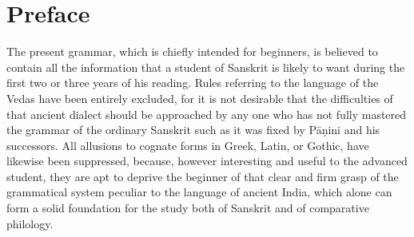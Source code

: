 \def\DevnagVersion{2.17}%
\chapter{Preface}

The present grammar, which is chiefly intended for beginners, is
believed to contain all the information that a student of Sanskrit is
likely to want during the first two or three years of his reading. Rules
referring to the language of the Vedas have been entirely excluded, for
it is not desirable that the difficulties of that ancient dialect should
be approached by any one who has not fully mastered the grammar of the
ordinary Sanskrit such as it was fixed by Pāṇini and his successors. All
allusions to cognate forms in Greek, Latin, or Gothic, have likewise
been suppressed, because, however interesting and useful to the advanced
student, they are apt to deprive the beginner of that clear and firm
grasp of the grammatical system peculiar to the language of ancient
India, which alone can form a solid foundation for the study both of
Sanskrit and of comparative philology.

